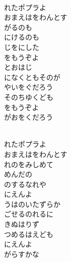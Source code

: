 \documentclass[10pt,b5j]{tarticle} %
\begin{document}
\begin{enumerate}
\begin{minipage}[c]{\blocksize}
        \vspace{\linespace}
        \item~\\
        れたポプラよ\\
        おまえはをわんとす\\
        がるのも\\
        にけるのも\\
        じをにした\\
        をもうぞよ\\
        とおはじ\\
        になくともそのが\\
        やいをぐだろう\\
        そのちゆくども\\
        をもうぞよ\\
        がおをくだろう
        
    \end{minipage}
    \begin{minipage}[c]{\blocksize}
        
        \vspace{\linespace}
        \item~\\
        れたポプラよ\\
        おまえはをわんとす\\
        れのをみしめて\\
        めんだの\\
        のするなれや\\
        にえんよ\\
        うはのいたずらか\\
        ごせるのれるに\\
        きぬはりず\\
        つめるはえども\\
        にえんよ\\
        がらすかな
    
    \end{minipage}
\end{enumerate} %
\end{document}
